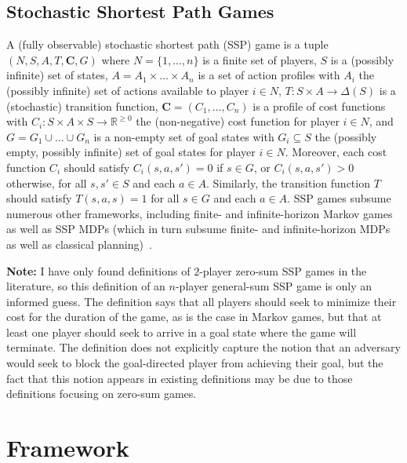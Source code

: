 \documentclass[10pt]{article}
\theoremstyle{plain}
\newcommand{\vect}[1]{\bm{#1}}
\newenvironment{note}[1][Note]{
    \begin{center}
    	\begin{minipage}{0.9\linewidth}
    		\begin{mdframed}[backgroundcolor=yellow!25,linewidth=0pt]
    			\textbf{#1:} }{
    		\end{mdframed}
    	\end{minipage}
    \end{center}
}
\begin{document}
\subsection{Stochastic Shortest Path Games}
A (fully observable) stochastic shortest path (SSP) game is a tuple $(N, S, A, T, \vect{C}, G)$ where
$N = \{ 1, \dots, n \}$ is a finite set of players,
$S$ is a (possibly infinite) set of states,
$A = A_{1} \times \dots \times A_{n}$ is a set of action profiles with $A_{i}$ the (possibly infinite) set of actions available to player $i \in N$,
$T : S \times A \to \Delta(S)$ is a (stochastic) transition function,
$\vect{C} = (C_{1}, \dots, C_{n})$ is a profile of cost functions with $C_{i} : S \times A \times S \to \mathbb{R}^{\ge 0}$ the (non-negative) cost function for player $i \in N$,
and $G = G_{1} \cup \dots \cup G_{n}$ is a non-empty set of goal states with $G_{i} \subseteq S$ the (possibly empty, possibly infinite) set of goal states for player $i \in N$.
Moreover, each cost function $C_{i}$ should satisfy $C_{i}(s, a, s') = 0$ if $s \in G$, or $C_{i}(s, a, s') > 0$ otherwise, for all $s, s' \in S$ and each $a \in A$.
Similarly, the transition function $T$ should satisfy $T(s, a, s) = 1$ for all $s \in G$ and each $a \in A$.
SSP games subsume numerous other frameworks, including finite- and infinite-horizon Markov games as well as SSP MDPs (which in turn subsume finite- and infinite-horizon MDPs as well as classical planning)~\cite{Bertsekas:book:1995,Patek:PhD:1997,Patek:JCO:1999,Kolobov:book:2012}.

\begin{note}
    I have only found definitions of $2$-player zero-sum SSP games in the literature, so this definition of an $n$-player general-sum SSP game is only an informed guess.
    The definition says that all players should seek to minimize their cost for the duration of the game, as is the case in Markov games, but that at least one player should seek to arrive in a goal state where the game will terminate.
    The definition does not explicitly capture the notion that an adversary would seek to block the goal-directed player from achieving their goal, but the fact that this notion appears in existing definitions may be due to those definitions focusing on zero-sum games.
\end{note}

\newpage
\section{Framework}\label{section:framework}
\end{document}
